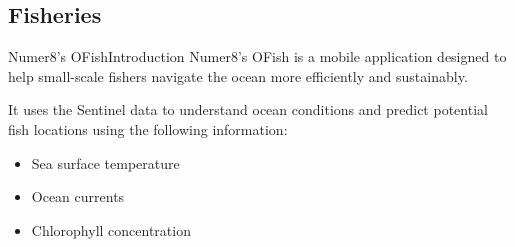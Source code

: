 \documentclass[aspectratio=169]{beamer} %
\begin{document}
      
      
    
    
    \subsection{Fisheries}


    \begin{frame}{Numer8's OFish}{Introduction}
      Numer8's OFish is a mobile application designed to help small-scale fishers navigate the ocean more efficiently and sustainably. 

      It uses the Sentinel data to understand ocean conditions and predict potential fish locations using the following information: 
      
          \begin{itemize}
              \item Sea surface temperature
              \item Ocean currents
              \item Chlorophyll concentration
          \end{itemize}
    \end{frame}
    
\end{document}
